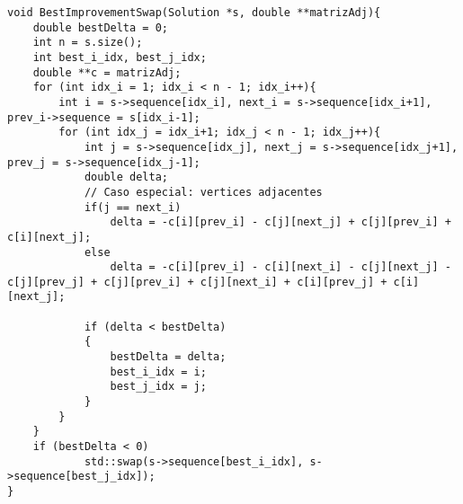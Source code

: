 \begin{lstlisting}[style=cplusplusListStyle, caption=Estrutura de vizinhança \textbf{swap}., label=exemploBestImproveSwapCodigo]
void BestImprovementSwap(Solution *s, double **matrizAdj){
    double bestDelta = 0;
    int n = s.size();
    int best_i_idx, best_j_idx;
    double **c = matrizAdj;
    for (int idx_i = 1; idx_i < n - 1; idx_i++){
        int i = s->sequence[idx_i], next_i = s->sequence[idx_i+1], prev_i->sequence = s[idx_i-1];
        for (int idx_j = idx_i+1; idx_j < n - 1; idx_j++){
            int j = s->sequence[idx_j], next_j = s->sequence[idx_j+1], prev_j = s->sequence[idx_j-1];
            double delta;
            // Caso especial: vertices adjacentes
            if(j == next_i)
                delta = -c[i][prev_i] - c[j][next_j] + c[j][prev_i] + c[i][next_j];
            else
                delta = -c[i][prev_i] - c[i][next_i] - c[j][next_j] - c[j][prev_j] + c[j][prev_i] + c[j][next_i] + c[i][prev_j] + c[i][next_j];
            
            if (delta < bestDelta)
            {
                bestDelta = delta;
                best_i_idx = i;
                best_j_idx = j;
            }
        }
    }
    if (bestDelta < 0)
            std::swap(s->sequence[best_i_idx], s->sequence[best_j_idx]);
}
\end{lstlisting}
\fi
